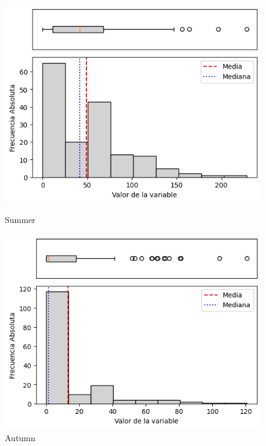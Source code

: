 \begin{figure}[htbp]
\centering
\begin{minipage}{0.30\textwidth}
  \includegraphics[width=\linewidth]{resultados/por_estacion_del_anio/boxplot_clases_por_estacion/Candavare/P_HistBoxplot_Summer.png}
  \caption*{Summer}
\end{minipage}
\hfill
\begin{minipage}{0.30\textwidth}
  \includegraphics[width=\linewidth]{resultados/por_estacion_del_anio/boxplot_clases_por_estacion/Candavare/P_HistBoxplot_Autumn.png}
  \caption*{Autumn}
\end{minipage}

\vspace{0.2cm}


\end{figure}
